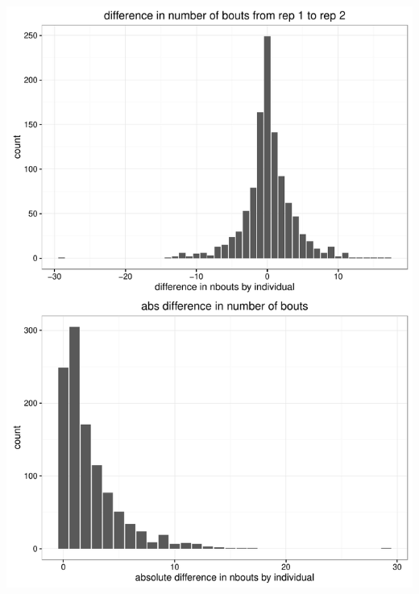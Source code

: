 \documentclass[11pt]{article}\usepackage[]{graphicx}\usepackage[]{color}
\makeatletter
\def\maxwidth{ %
  \ifdim\Gin@nat@width>\linewidth
    \linewidth
  \else
    \Gin@nat@width
  \fi
}
\newenvironment{knitrout}{}{} %
\makeatother
\begin{document}
\begin{knitrout}
\color{fgcolor}
\includegraphics[width=\maxwidth]{figure/p1a-1} 

\end{knitrout}
\end{document}
